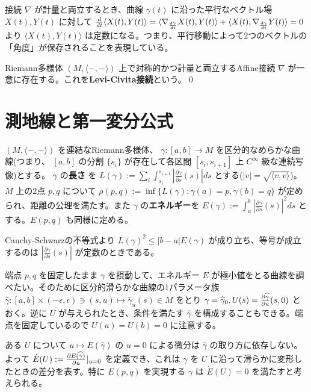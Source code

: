 \documentclass[dvipdfmx,a4paper]{jsreport}
\theoremstyle{definition}
\newcommand{\der}{\partial}
\renewcommand{\hat}{\widehat}
\begin{document}
接続 $\nabla$ が計量と両立するとき、曲線 $\gamma(t)$ に沿った平行なベクトル場 $X(t),Y(t)$ に対して $\frac{d}{dt}\langle X(t),Y(t) \rangle=\langle \nabla_{d\gamma \over {dt}} X(t),Y(t)\rangle+\langle X(t),\nabla_{d\gamma \over {dt}} Y(t)\rangle=0$ より $\langle X(t),Y(t)\rangle$ は定数になる。つまり、平行移動によって2つのベクトルの「角度」が保存されることを表現している。

\thm Riemann多様体 $(M,\langle -,- \rangle)$ 上で対称的かつ計量と両立するAffine接続 $\nabla$ が一意に存在する。これを\textbf{Levi-Civita接続}という。\qed

\section{測地線と第一変分公式}

 $(M,\langle -,- \rangle)$ を連結なRiemann多様体、 $\gamma \colon [a,b] \to M$ を区分的なめらかな曲線(つまり、 $[a,b]$ の分割 $\{s_i\}$ が存在して各区間 $[s_i,s_{i+1}]$ 上 $C^\infty$ 級な連続写像)とする。 $\gamma$ の\textbf{長さ} を $L(\gamma) := \sum_{i} \int_{s_i}^{s_{i+1}}|\frac{\der \gamma}{\der s}(s)| ds$ とする($|v|=\sqrt{\langle v,v\rangle}$)。$M$ 上の2点 $p,q$ について $\rho(p,q) := \inf\{L(\gamma) \colon \gamma(a)=p,\gamma(b)=q\}$ が定められ、距離の公理を満たす。また $\gamma$ の\textbf{エネルギー}を $E(\gamma) := \int_{a}^b |\frac{\der \gamma}{\der s}(s)|^2 ds$ とする。$E(p,q)$ も同様に定める。


Cauchy-Schwarzの不等式より $L(\gamma)^2 \leq |b-a|E(\gamma)$ が成り立ち、等号が成立するのは $|\frac{\der \gamma}{\der s}(s)|$ が定数のときである。


端点 $p,q$ を固定したまま $\gamma$ を摂動して、エネルギー $E$ が極小値をとる曲線を調べたい。そのために区分的滑らかな曲線の1パラメータ族 $\hat{\gamma}:[a,b] \times (-\epsilon,\epsilon) \ni (s,u)\mapsto \hat{\gamma}_u(s) \in M$ をとり $\gamma=\hat{\gamma}_0,U(s)={{\der \hat{\gamma}} \over {\der u}}(s,0)$ とおく。逆に $U$ が与えられたとき、条件を満たす $\hat{\gamma}$ を構成することもできる。端点を固定しているので $U(a)=U(b)=0$ に注意する。

ある $U$ について $u \mapsto E(\hat{\gamma})$ の $u=0$ による微分は $\hat{\gamma}$ の取り方に依存しない。よって $\dot{E}(U) := {\der E(\hat{\gamma}) \over \der u}|_{u=0}$ を定義でき、これは $\gamma$ を $U$ に沿って滑らかに変形したときの差分を表す。特に $E(p,q)$ を実現する $\gamma$ は $\dot{E}(U)=0$ を満たすと考えられる。
\end{document}
